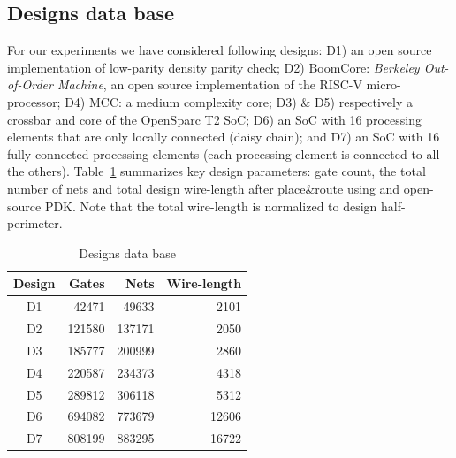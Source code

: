 \documentclass[conference]{IEEEtran}
\begin{document}
\subsection{Designs data base}
For our experiments we have considered following designs: D1) an open source implementation of low-parity density parity check; D2) BoomCore: \textit{Berkeley Out-of-Order Machine}, an open source implementation of the RISC-V micro-processor; D4) MCC: a medium complexity core; D3) \& D5) respectively a crossbar and core of the OpenSparc T2 SoC;  D6) an SoC with 16 processing elements that are only locally connected (daisy chain); and D7) an SoC with 16 fully connected processing elements (each processing element is connected to all the others). Table~\ref{tab:designs} summarizes key design parameters: gate count, the total number of nets and total design wire-length after place\&route using and open-source PDK. Note that the total wire-length is normalized to design half-perimeter. 
\begin{table}
\renewcommand{\arraystretch}{1.25}
\caption{Designs data base}
\label{tab:designs}
\centering

\begin{tabular}{||c|r|r|r||}
\hline
Design & Gates  & Nets & Wire-length\\
\hline %
D1              &  42471 &  49633 & 2101\\
\hline %
D2              & 121580 & 137171 & 2050\\
\hline %
D3              & 185777 & 200999 & 2860\\
\hline %
D4              & 220587 & 234373 & 4318 \\
\hline %
D5              & 289812 & 306118 & 5312\\
\hline %
D6              & 694082 & 773679 & 12606\\
\hline %
D7              & 808199 & 883295 & 16722\\
\hline
\end{tabular}
\end{table}
\end{document}
